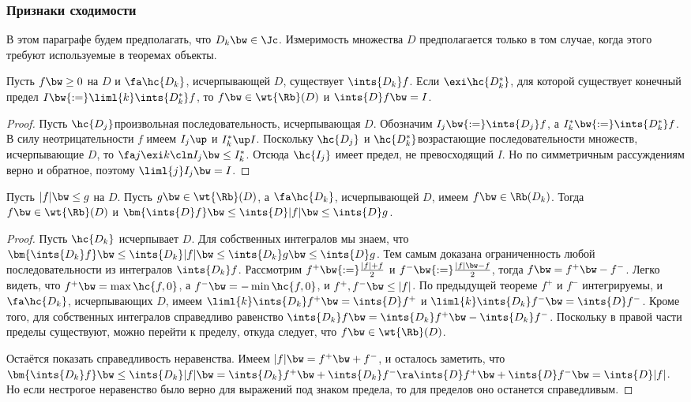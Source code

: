 \documentclass[a4paper]{article}
\newcommand{\Rbt}{\wt{\Rb}}
\begin{document}
\subsubsection{Признаки сходимости}

В этом параграфе будем предполагать, что $D_k \bw\in \Jc$. Измеримость множества $D$ предполагается
только в том случае, когда этого требуют используемые в теоремах объекты.

\begin{theorem}
Пусть $f \bw\ge 0$ на $D$ и $\fa \hc{D_k}$, исчерпывающей $D$, существует $\ints{D_k} f$. Если
$\exi \hc{D_k^*}$, для которой существует конечный предел $I \bw{:=} \liml{k} \ints{D_k^*} f$, то
$f \bw\in \Rbt(D)$ и $\ints{D}f \bw= I$.
\end{theorem}
\begin{proof}
Пусть $\hc{D_j}$\т произвольная последовательность, исчерпывающая $D$. Обозначим $I_j \bw{:=}
\ints{D_j} f$, а $I_k^* \bw{:=} \ints{D_k^*}f$. В силу неотрицательности $f$ имеем $I_j \up$ и
$I_k^* \up I$. Поскольку $\hc{D_j}$ и $\hc{D_k^*}$\т возрастающие последовательности
множеств, исчерпывающие $D$, то $\fa j \exi k\cln I_j \bw\le I_k^*$. Отсюда $\hc{I_j}$ имеет предел, не
превосходящий $I$. Но по симметричным рассуждениям верно и обратное, поэтому $\liml{j} I_j \bw= I$.
\end{proof}

\begin{theorem}
Пусть $|f|\bw\le g$ на $D$. Пусть $g \bw\in \Rbt(D)$, а $\fa \hc{D_k}$, исчерпывающей $D$, имеем $f \bw\in
\Rb(D_k)$. Тогда $f \bw\in \Rbt(D)$ и $\bm{\ints{D}f} \bw\le \ints{D} |f|\bw\le \ints{D} g$.
\end{theorem}
\begin{proof}
Пусть $\hc{D_k}$ исчерпывает $D$. Для собственных интегралов мы знаем, что $\bm{\ints{D_k}f} \bw\le
\ints{D_k} |f| \bw\le \ints{D_k} g \bw\le \ints{D} g$. Тем самым доказана ограниченность любой
последовательности из интегралов $\ints{D_k} f$. Рассмотрим $f^+ \bw{:=} \frac{|f| + f}{2}$ и $f^-
\bw{:=} \frac{|f| \bw- f}{2}$, тогда $f \bw= f^+ \bw- f^-$. Легко видеть, что $f^+ \bw= \max\hc{f,
0}$, а $f^- \bw= -\min\hc{f, 0}$, и $f^+, f^- \bw\le |f|$. По предыдущей теореме $f^+$ и $f^-$
интегрируемы, и $\fa \hc{D_k}$, исчерпывающих $D$, имеем $\liml{k} \ints{D_k} f^+ \bw= \ints{D}
f^+$ и $\liml{k} \ints{D_k} f^- \bw= \ints{D} f^-$. Кроме того, для собственных интегралов
справедливо равенство $\ints{D_k} f \bw= \ints{D_k} f^+ \bw- \ints{D_k} f^-$. Поскольку в правой
части пределы существуют, можно перейти к пределу, откуда следует, что $f \bw\in \Rbt(D)$.

Остаётся показать справедливость неравенства. Имеем $|f| \bw= f^+ \bw+ f^-$, и осталось заметить, что
$\bm{\ints{D_k} f} \bw\le \ints{D_k}|f| \bw= \ints{D_k} f^+ \bw+ \ints{D_k} f^- \ra \ints{D} f^+ \bw+ \ints{D}
f^- \bw= \ints{D} |f|$. Но если нестрогое неравенство было верно для выражений под знаком предела, то
для пределов оно останется справедливым.
\end{proof}
\end{document}
